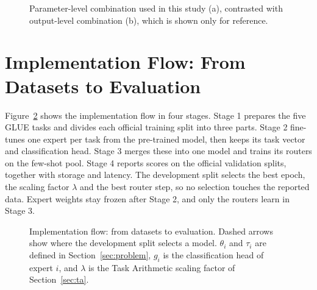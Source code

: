 \begin{figure}[htbp]
  \centering
  \resizebox{.62\linewidth}{!}{}
  \caption{Parameter-level combination used in this study (a), contrasted with output-level combination (b), which is shown only for reference.}
  \label{fig:we}
\end{figure}

\section{Implementation Flow: From Datasets to Evaluation}
\label{sec:flow}

Figure~\ref{fig:flow} shows the implementation flow in four stages. Stage 1 prepares the five GLUE tasks and divides each official training split into three parts. Stage 2 fine-tunes one expert per task from the pre-trained model, then keeps its task vector and classification head. Stage 3 merges these into one model and trains its routers on the few-shot pool. Stage 4 reports scores on the official validation splits, together with storage and latency. The development split selects the best epoch, the scaling factor $\lambda$ and the best router step, so no selection touches the reported data. Expert weights stay frozen after Stage 2, and only the routers learn in Stage 3.

\begin{figure}[htbp]
  \centering
  \resizebox{.8\linewidth}{!}{}
  \caption{Implementation flow: from datasets to evaluation. Dashed arrows show where the development split selects a model. $\theta_i$ and $\tau_i$ are defined in Section~\ref{sec:problem}, $g_i$ is the classification head of expert $i$, and $\lambda$ is the Task Arithmetic scaling factor of Section~\ref{sec:ta}.}
  \label{fig:flow}
\end{figure}

